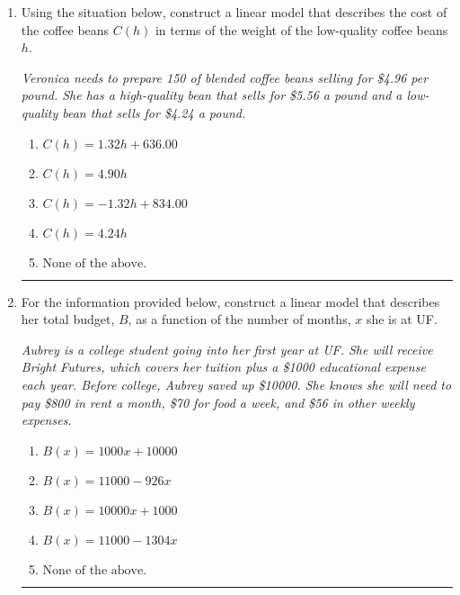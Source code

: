 \documentclass[14pt]{extbook}
\newcommand{\litem}[1]{\item#1\hspace*{-1cm}\rule{\textwidth}{0.4pt}}
\begin{document}
\begin{enumerate}
{\begin{enumerate}[label=\Alph*.]
\end{enumerate} }
\litem{
Using the situation below, construct a linear model that describes the cost of the coffee beans $C(h)$ in terms of the weight of the low-quality coffee beans $h$.
\begin{center}
    \textit{ Veronica needs to prepare 150 of blended coffee beans selling for \$4.96 per pound. She has a high-quality bean that sells for \$5.56 a pound and a low-quality bean that sells for \$4.24 a pound. }
\end{center}
\begin{enumerate}[label=\Alph*.]
\item \( C(h) = 1.32 h + 636.00 \)
\item \( C(h) = 4.90 h \)
\item \( C(h) = -1.32 h + 834.00 \)
\item \( C(h) = 4.24 h \)
\item \( \text{None of the above.} \)

\end{enumerate} }
\litem{
For the information provided below, construct a linear model that describes her total budget, $B$, as a function of the number of months, $x$ she is at UF.
\begin{center}
    \textit{ Aubrey is a college student going into her first year at UF. She will receive Bright Futures, which covers her tuition plus a \$1000 educational expense each year. Before college, Aubrey saved up \$10000. She knows she will need to pay \$800 in rent a month, \$70 for food a week, and \$56 in other weekly expenses. }
\end{center}
\begin{enumerate}[label=\Alph*.]
\item \( B(x) = 1000 x + 10000 \)
\item \( B(x) = 11000 - 926 x \)
\item \( B(x) = 10000 x + 1000 \)
\item \( B(x) = 11000 - 1304 x \)
\item \( \text{None of the above.} \)

\end{enumerate} }
\end{enumerate}
\end{document}
